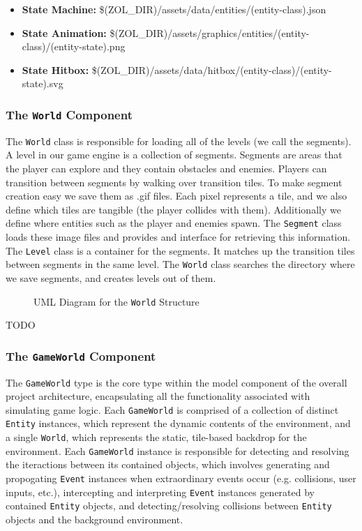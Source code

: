 \documentclass{article}
\newcommand{\classname}[1] {\texttt{#1}}
\newcommand{\insertdiagram}[2]
{
	\begin{figure}[H]
		\centering
		\fbox{\texttt{[image: figures/\#1]}}
		\caption{UML Diagram for the \classname{#1} Structure}
	\end{figure}
}
\begin{document}
			\begin{itemize}
				\item \textbf{State Machine:} \$(ZOL\_DIR)/assets/data/entities/(entity-class).json
				\item \textbf{State Animation:} \$(ZOL\_DIR)/assets/graphics/entities/(entity-class)/(entity-state).png
				\item \textbf{State Hitbox:} \$(ZOL\_DIR)/assets/data/hitbox/(entity-class)/(entity-state).svg
			\end{itemize}

			\subsubsection[\classname{World}]{The \classname{World} Component}
			The \classname{World} class is responsible for loading all of the levels (we call the segments). 
			A level in our game engine is a collection of segments. Segments are areas that the 
			player can explore and they contain obstacles and enemies. Players can transition between 
			segments by walking over transition tiles. To make segment creation easy we save them as 
			.gif files. Each pixel represents a tile, and we also define which tiles are tangible 
			(the player collides with them). Additionally we define where entities such as the player 
			and enemies spawn. The \classname{Segment} class loads these image files and provides and interface 
			for retrieving this information. The \classname{Level} class is a container for the segments. It matches 
			up the transition tiles between segments in the same level. The \classname{World} class searches the 
			directory where we save segments, and creates levels out of them.

			\insertdiagram{World}{2.0in}

			TODO

			\subsubsection[\classname{GameWorld}]{The \classname{GameWorld} Component}
			The \classname{GameWorld} type is the core type within the model 
			component of the overall project architecture, encapsulating all 
			the functionality associated with simulating game logic.  Each
			\classname{GameWorld} is comprised of a collection of distinct
			\classname{Entity} instances, which represent the dynamic contents
			of the environment, and a single \classname{World}, which represents
			the static, tile-based backdrop for the environment.  Each \classname{GameWorld} instance
			is responsible for detecting and resolving the iteractions between
			its contained objects, which involves generating and propogating 
			\classname{Event} instances when extraordinary events occur (e.g.
			collisions, user inputs, etc.), intercepting and interpreting 
			\classname{Event} instances generated by contained \classname{Entity} 
			objects, and detecting/resolving collisions between \classname{Entity} 
			objects and the background environment.
\end{document}
